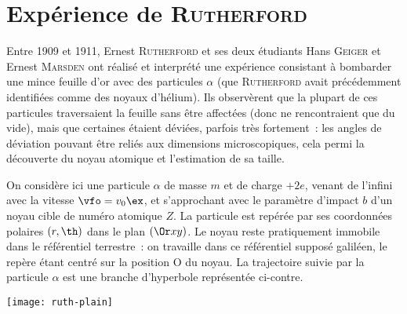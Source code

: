 \documentclass[a4paper, 10pt, final, garamond]{book}
\begin{document}
\section{Expérience de \textsc{Rutherford}}
Entre 1909 et 1911, Ernest \textsc{Rutherford} et ses deux étudiants Hans
\textsc{Geiger} et Ernest \textsc{Marsden} ont réalisé et interprété une
expérience consistant à bombarder une mince feuille d'or avec des particules
$\alpha$ (que \textsc{Rutherford} avait précédemment identifiées comme des
noyaux d'hélium). Ils observèrent que la plupart de ces particules
traversaient la feuille sans être affectées (donc ne rencontraient que du
vide), mais que certaines étaient déviées, parfois très fortement~: les angles
de déviation pouvant être reliés aux dimensions microscopiques, cela permi la
découverte du noyau atomique et l'estimation de sa taille.
\smallbreak
\noindent
\begin{minipage}[c]{.48\linewidth}
	On considère ici une particule $\alpha$ de masse $m$ et de charge $+2e$, venant
	de l'infini avec la vitesse $\vfo = v_0\ex$, et s'approchant avec le paramètre
	d'impact $b$ d'un noyau cible de numéro atomique $Z$. La particule est repérée
	par ses coordonnées polaires $(r,\th)$ dans le plan $(\Or xy)$.
	\bigbreak
	Le noyau reste pratiquement immobile dans le référentiel terrestre~: on
	travaille dans ce référentiel supposé galiléen, le repère étant centré sur la
	position O du noyau. La trajectoire suivie par la particule $\alpha$ est une
	branche d'hyperbole représentée ci-contre.
\end{minipage}
\hfill
\begin{minipage}[c]{.48\linewidth}
	\begin{center}
		\texttt{[image: ruth-plain]}
		\label{fig:ruth}
	\end{center}
\end{minipage}
\end{document}

